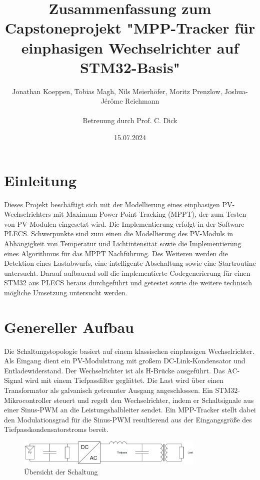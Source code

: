 \documentclass[a4paper,11pt,oneside]{article}
\title{Zusammenfassung zum Capstoneprojekt "MPP-Tracker für einphasigen Wechselrichter
	auf STM32-Basis"}
\author{Jonathan Koeppen, Tobias Magh, Nils Meierhöfer, Moritz Prenzlow, Joshua-Jérôme Reichmann\\ \\ \large{Betreuung durch Prof. C. Dick}}
\date{15.07.2024}
\begin{document}
	\maketitle
	\newpage
	\pagestyle{fancy}
	\tableofcontents

\section{Einleitung}
Dieses Projekt beschäftigt sich mit der Modellierung eines einphasigen PV-Wechselrichters mit Maximum Power Point Tracking (MPPT), der
zum Testen von PV-Modulen eingesetzt wird. Die Implementierung erfolgt in der Software PLECS. Schwerpunkte sind zum einen die
Modellierung des PV-Moduls in Abhängigkeit von Temperatur und Lichtintensität sowie die Implementierung eines Algorithmus für das MPPT
Nachführung. Des Weiteren werden die Detektion eines Lastabwurfs, eine intelligente Abschaltung sowie eine Startroutine untersucht. Darauf
aufbauend soll die implementierte Codegenerierung für einen STM32 aus PLECS heraus durchgeführt und getestet sowie die weitere technisch
mögliche Umsetzung untersucht werden.
\\
\section{Genereller Aufbau}
Die Schaltungstopologie basiert auf einem klassischen einphasigen Wechselrichter. Als Eingang dient ein PV-Modulstrang mit großem DC-Link-Kondensator und Entladewiderstand. Der Wechselrichter ist als H-Brücke ausgeführt. Das AC-Signal wird mit einem Tiefpassfilter geglättet. Die Last wird über einen Transformator als galvanisch getrennter Ausgang angeschlossen. Ein STM32-Mikrocontroller steuert und regelt den Wechselrichter, indem er Schaltsignale aus einer Sinus-PWM an die Leistungshalbleiter sendet. Ein MPP-Tracker stellt dabei den Modulationsgrad für die Sinus-PWM resultierend aus der Eingangsgröße des Tiefpasskondensatorstroms bereit.

\begin{figure}[H]
	\centering
	\includegraphics[width=0.8\textwidth]{Aufbau.jpeg}
	\caption{Übersicht der Schaltung}
\end{figure}
\end{document}
